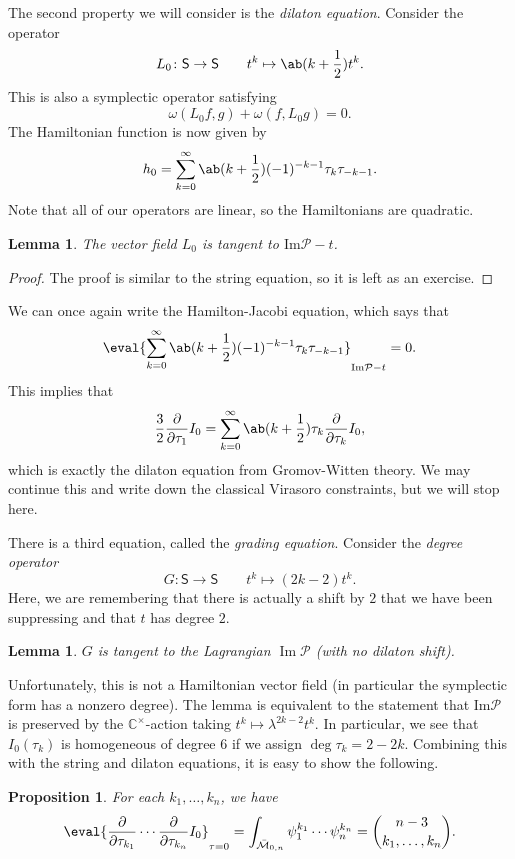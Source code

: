 \documentclass{amsart}
\newtheorem{prop}[thm]{Proposition}
\newtheorem{lem}[thm]{Lemma}
\theoremstyle{definition}
\theoremstyle{remark}
\theoremstyle{plain}
\theoremstyle{definition}
\theoremstyle{remark}
\newcommand{\Ima}{\mathrm{Im}}
\newcommand{\C}{\mathbb{C}}
\newcommand{\M}{\mathcal{M}}
\newcommand{\mc}[1]{\mathcal{#1}}
\newcommand{\on}[1]{\operatorname{#1}}
\newcommand{\ms}[1]{\mathsf{#1}}
\newcommand{\1}{\mathbf{1}}
\newcommand{\2}{\mathbf{2}}
\newcommand{\3}{\mathbf{3}}
\begin{document}
The second property we will consider is the \textit{dilaton equation}. Consider the operator
\[ L_0 \colon \ms{S} \to \ms{S} \qquad t^k \mapsto \ab(k + \frac{1}{2}) t^k. \]
This is also a symplectic operator satisfying
\[ \omega(L_0 f, g) + \omega(f, L_0 g) = 0. \]
The Hamiltonian function is now given by
\[ h_0 = \sum_{k=0}^{\infty} \ab(k + \frac{1}{2}) (-1)^{-k-1} \tau_k \tau_{-k-1}. \]
Note that all of our operators are linear, so the Hamiltonians are quadratic. 

\begin{lem}
    The vector field \(L_0\) is tangent to \(\Ima\mc{P} - t\).
\end{lem}

\begin{proof}
    The proof is similar to the string equation, so it is left as an exercise.
\end{proof}

We can once again write the Hamilton-Jacobi equation, which says that
\[ \eval{\sum_{k=0}^{\infty} \ab(k + \frac{1}{2}) (-1)^{-k-1} \tau_k \tau_{-k-1}}_{\Ima\mc{P} - t} = 0. \]
This implies that
\[ \frac{3}{2} \pdv{}{\tau_1} I_0 = \sum_{k=0}^{\infty} \ab(k + \frac{1}{2}) \tau_k \pdv{}{\tau_k} I_0, \]
which is exactly the dilaton equation from Gromov-Witten theory. We may continue this and write down the classical Virasoro constraints, but we will stop here.

There is a third equation, called the \textit{grading equation}. Consider the \textit{degree operator}
\[ G \colon \ms{S} \to \ms{S} \qquad t^k \mapsto (2k-2) t^k. \]
Here, we are remembering that there is actually a shift by \(2\) that we have been suppressing and that \(t\) has degree \(2\).

\begin{lem}
    \(G\) is tangent to the Lagrangian \(\on{Im} \mc{P}\) (with no dilaton shift).
\end{lem}

Unfortunately, this is not a Hamiltonian vector field (in particular the symplectic form has a nonzero degree). The lemma is equivalent to the statement that \(\Ima\mc{P}\) is preserved by the \(\C^{\times}\)-action taking \(t^k \mapsto \lambda^{2k-2} t^k\). In particular, we see that \(I_0 (\tau_k)\) is homogeneous of degree \(6\) if we assign \(\deg \tau_k = 2-2k\). Combining this with the string and dilaton equations, it is easy to show the following.

\begin{prop}
    For each \(k_1, \ldots, k_n\), we have
    \[ \eval{\pdv{}{\tau_{k_1}} \cdots \pdv{}{\tau_{k_n}} I_0}_{\tau = 0} = \int_{\bar{\M}_{0,n}} \psi_1^{k_1} \cdots \psi_n ^{k_n} = \binom{n-3}{k_1, \ldots, k_n}. \]
\end{prop}
\end{document}

